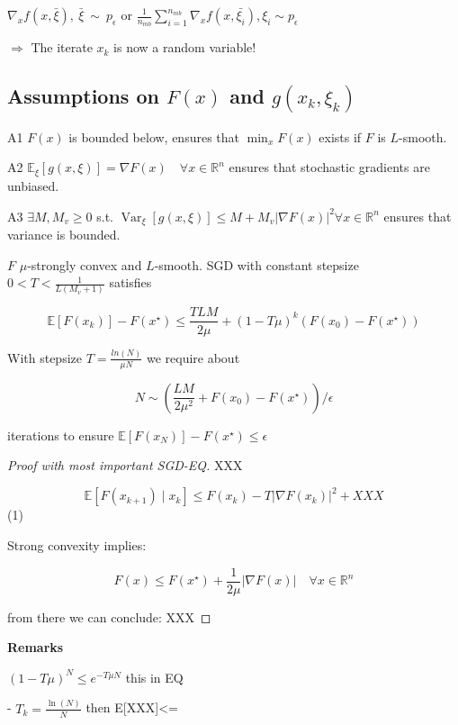 $\nabla_xf(x,\bar{\xi}),\ \bar{\xi}\ \sim \ p_\epsilon$
or
$\frac{1}{n_{mb}}\sum_{i=1}^{n_{mb}}\nabla_xf(x,\bar{\xi_i}), \xi_i \sim p_\epsilon$

$\Rightarrow$ The iterate $x_k$ is now a random variable!

\subsection{Assumptions on $F(x)$ and $g(x_k,\xi_k)$}

A1 $F(x)$ is bounded below,
ensures that $\min_{x}F(x)$ exists if $F$ is $L$-smooth.

A2 $\mathbb{E}_\xi[g(x,\xi)]=\nabla F(x)\quad \forall x \in \mathbb{R}^{n}$
ensures that stochastic gradients are unbiased.

A3 $\exists M,M_v\ge0$ s.t.
$\operatorname{Var}_{\xi}[g(x,\xi)]\le
	M+M_v|\nabla F(x)|^2
	\forall x\in\mathbb{R}^{n}$
ensures that variance is bounded.

\begin{proposition}
	$F$ $\mu$-strongly convex and $L$-smooth.
	SGD with constant stepsize
	$0<T<\frac{1}{L(M_v + 1)}$
	satisfies

	$$\mathbb{E}[F(x_k)]-F(x^\star)\le
		\frac{TLM}{2\mu}+(1-T\mu)^k(F(x_0)-F(x^\star))$$

	With stepsize $T=\frac{ln(N)}{\mu N}$ we require about

	$$N\sim\left(\frac{LM}{2\mu^2}+F(x_0)-F(x^\star)\right)/\epsilon$$

	iterations to ensure
	$\mathbb{E}[F(x_N)] - F(x^\star)\le\epsilon$
\end{proposition}

\begin{proof}[Proof with most important SGD-EQ]

	XXX

	$$\mathbb{E} [F(x_{k+1})\mid x_k]\le F(x_k) -T |\nabla F(x_k)|^2 + XXX$$ (1)

	Strong convexity implies:

	$$ F(x) \le F(x^\star) + \frac{1}{2\mu}|\nabla F(x)|\quad \forall{x \in \mathbb{R}^{n}} $$

	from there we can conclude:
	XXX

\end{proof}


\textbf{Remarks}

$(1-T\mu)^N\le e^{-T\mu N}$ this  in EQ

- $T_k=\frac{\ln(N)}{N}$ then E[XXX]<=


